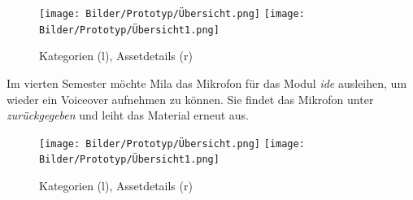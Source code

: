 \begin{figure}[h]
    \centering
    \texttt{[image: Bilder/Prototyp/Übersicht.png]}\hspace{2em}
    \texttt{[image: Bilder/Prototyp/Übersicht1.png]}
    \label{fig:p4}
    \caption[Mockup: Kategorien, Assets, Assetdetails]{Kategorien (l), Assetdetails (r)}
\end{figure}

Im vierten Semester möchte Mila das Mikrofon für das Modul \textit{\ac{ide}}
ausleihen, um wieder ein Voiceover aufnehmen zu können. Sie findet das Mikrofon
unter \textit{zurückgegeben} und leiht das Material erneut aus.

\begin{figure}[h]
    \centering
    \texttt{[image: Bilder/Prototyp/Übersicht.png]}\hspace{2em}
    \texttt{[image: Bilder/Prototyp/Übersicht1.png]}
    \label{fig:p4}
    \caption[Mockup: Kategorien, Assets, Assetdetails]{Kategorien (l), Assetdetails (r)}
\end{figure}